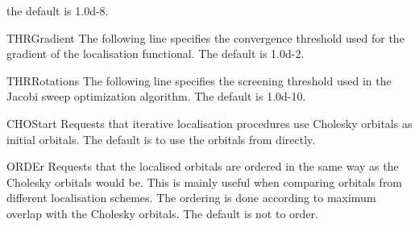 \begin{keywordlist}
the default is 1.0d-8.
\item[THRGradient]
The following line specifies the convergence threshold used for
the gradient of the localisation functional. The default is 1.0d-2.
\item[THRRotations]
The following line specifies the screening threshold used in
the Jacobi sweep optimization algorithm. The default is 1.0d-10.
\item[CHOStart]
Requests that iterative localisation procedures use Cholesky orbitals
as initial orbitals. The default is to use the orbitals from
 directly.
\item[ORDEr]
Requests that the localised orbitals are ordered in the same way
as the Cholesky orbitals would be. This is mainly useful when
comparing orbitals from different localisation schemes. The
ordering is done according to maximum overlap with the
Cholesky orbitals. The default is not to order.

\end{keywordlist}
